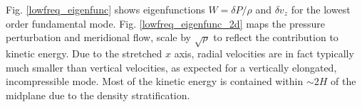 

Fig. \ref{lowfreq_eigenfunc} shows 
eigenfunctions $W = \delta P/\rho$ and $\delta   v_z$ for the lowest order fundamental mode.  
Fig. \ref{lowfreq_eigenfunc_2d} maps the pressure perturbation and meridional flow,
scale by $\sqrt{\rho}$ to reflect the contribution to kinetic energy. Due to the stretched $x$ axis, 
radial velocities are in fact typically much 
smaller than vertical velocities, as expected for a vertically elongated, incompressible mode. 
Most of the kinetic energy is contained within $\sim 2H$ of the midplane due to the density 
stratification. 


